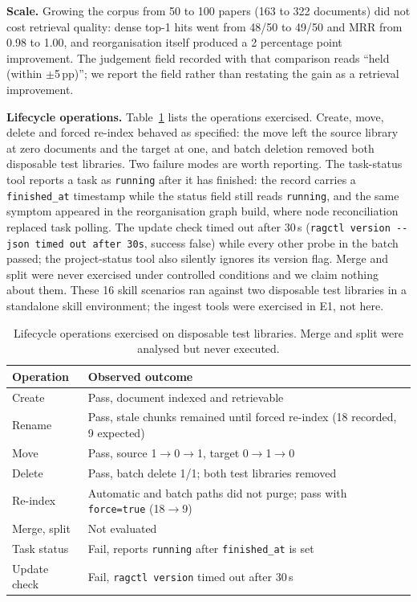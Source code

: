 \textbf{Scale.} Growing the corpus from 50 to 100 papers (163 to 322 documents) did not cost retrieval quality: dense top-1 hits went from 48/50 to 49/50 and MRR from 0.98 to 1.00, and reorganisation itself produced a 2 percentage point improvement. The judgement field recorded with that comparison reads ``held (within $\pm$5\,pp)''; we report the field rather than restating the gain as a retrieval improvement.

\textbf{Lifecycle operations.} Table~\ref{tab:org-ops} lists the operations exercised. Create, move, delete and forced re-index behaved as specified: the move left the source library at zero documents and the target at one, and batch deletion removed both disposable test libraries. Two failure modes are worth reporting. The task-status tool reports a task as \texttt{running} after it has finished: the record carries a \texttt{finished\_at} timestamp while the status field still reads \texttt{running}, and the same symptom appeared in the reorganisation graph build, where node reconciliation replaced task polling. The update check timed out after 30\,s (\texttt{ragctl version -{}-json timed out after 30s}, success false) while every other probe in the batch passed; the project-status tool also silently ignores its version flag. Merge and split were never exercised under controlled conditions and we claim nothing about them. These 16 skill scenarios ran against two disposable test libraries in a standalone skill environment; the ingest tools were exercised in E1, not here.

\begin{table}[t]
\centering
\small
\setlength{\tabcolsep}{4pt}
\caption{Lifecycle operations exercised on disposable test libraries.
Merge and split were analysed but never executed.}
\label{tab:org-ops}
\begin{tabular}{@{}ll@{}}
\toprule
Operation & Observed outcome \\
\midrule
Create & Pass, document indexed and retrievable \\
Rename & Pass, stale chunks remained until forced re-index (18 recorded, 9 expected) \\
Move & Pass, source 1$\rightarrow$0$\rightarrow$1, target 0$\rightarrow$1$\rightarrow$0 \\
Delete & Pass, batch delete 1/1; both test libraries removed \\
Re-index & Automatic and batch paths did not purge; pass with \texttt{force=true} (18$\rightarrow$9) \\
Merge, split & Not evaluated \\
Task status & Fail, reports \texttt{running} after \texttt{finished\_at} is set \\
Update check & Fail, \texttt{ragctl version} timed out after 30\,s \\
\bottomrule
\end{tabular}
\end{table}

